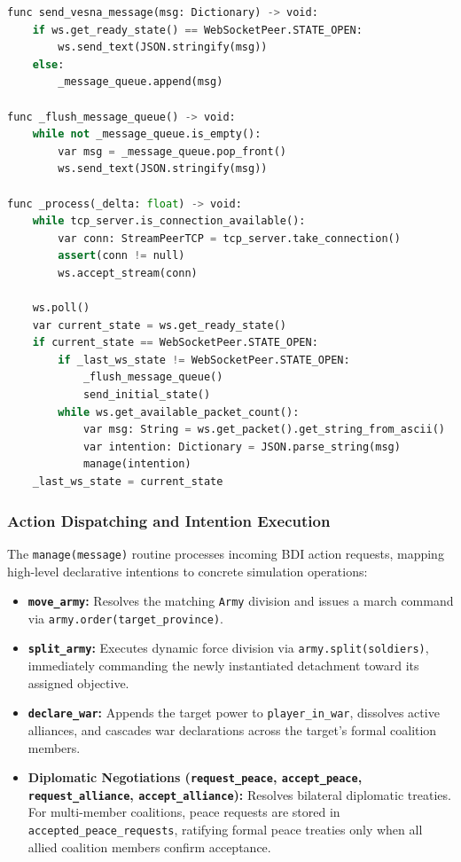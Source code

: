 \begin{lstlisting}[language=python, caption={WebSocket polling, FIFO queue flushing, and packet dispatching loop in GDScript.}, label={lst:network_process}]
func send_vesna_message(msg: Dictionary) -> void:
    if ws.get_ready_state() == WebSocketPeer.STATE_OPEN:
        ws.send_text(JSON.stringify(msg))
    else:
        _message_queue.append(msg)

func _flush_message_queue() -> void:
    while not _message_queue.is_empty():
        var msg = _message_queue.pop_front()
        ws.send_text(JSON.stringify(msg))

func _process(_delta: float) -> void:
    while tcp_server.is_connection_available():
        var conn: StreamPeerTCP = tcp_server.take_connection()
        assert(conn != null)
        ws.accept_stream(conn)
        
    ws.poll()
    var current_state = ws.get_ready_state()
    if current_state == WebSocketPeer.STATE_OPEN:
        if _last_ws_state != WebSocketPeer.STATE_OPEN:
            _flush_message_queue()
            send_initial_state()
        while ws.get_available_packet_count():
            var msg: String = ws.get_packet().get_string_from_ascii()
            var intention: Dictionary = JSON.parse_string(msg)
            manage(intention)
    _last_ws_state = current_state
\end{lstlisting}

\subsubsection{Action Dispatching and Intention Execution}
The \texttt{manage(message)} routine processes incoming BDI action requests, mapping high-level declarative intentions to concrete simulation operations:
\begin{itemize}
    \item \textbf{\texttt{move\_army}:} Resolves the matching \texttt{Army} division and issues a march command via \texttt{army.order(target\_province)}.
    \item \textbf{\texttt{split\_army}:} Executes dynamic force division via \texttt{army.split(soldiers)}, immediately commanding the newly instantiated detachment toward its assigned objective.
    \item \textbf{\texttt{declare\_war}:} Appends the target power to \texttt{player\_in\_war}, dissolves active alliances, and cascades war declarations across the target's formal coalition members.
    \item \textbf{Diplomatic Negotiations (\texttt{request\_peace}, \texttt{accept\_peace}, \texttt{request\_alliance}, \texttt{accept\_alliance}):} Resolves bilateral diplomatic treaties. For multi-member coalitions, peace requests are stored in \texttt{accepted\_peace\_requests}, ratifying formal peace treaties only when all allied coalition members confirm acceptance.
\end{itemize}

